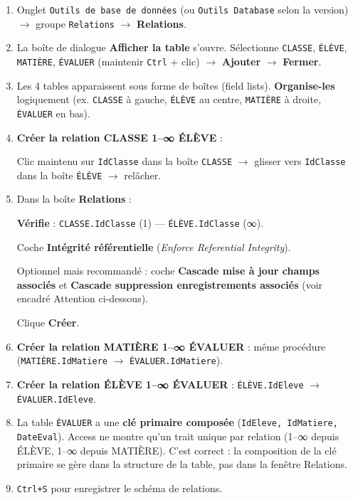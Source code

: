 \documentclass[11pt]{article}
\begin{document}
\begin{methode}
\begin{enumerate}
    \item Onglet \texttt{Outils de base de données} (ou \texttt{Outils Database} selon la version) $\to$ groupe \texttt{Relations} $\to$ \textbf{Relations}.
    \item La boîte de dialogue \textbf{Afficher la table} s'ouvre. Sélectionne \texttt{CLASSE}, \texttt{ÉLÈVE}, \texttt{MATIÈRE}, \texttt{ÉVALUER} (maintenir \texttt{Ctrl} + clic) $\to$ \textbf{Ajouter} $\to$ \textbf{Fermer}.
    \item Les 4 tables apparaissent sous forme de boîtes (field lists). \textbf{Organise-les} logiquement (ex. \texttt{CLASSE} à gauche, \texttt{ÉLÈVE} au centre, \texttt{MATIÈRE} à droite, \texttt{ÉVALUER} en bas).
    \item \textbf{Créer la relation CLASSE 1–∞ ÉLÈVE} :\par
    Clic maintenu sur \texttt{IdClasse} dans la boîte \texttt{CLASSE} $\to$ glisser vers \texttt{IdClasse} dans la boîte \texttt{ÉLÈVE} $\to$ relâcher.
    \item Dans la boîte \textbf{Relations} :\par
    \textbf{Vérifie} : \texttt{CLASSE.IdClasse} (1) — \texttt{ÉLÈVE.IdClasse} (∞).\par
    Coche \textbf{Intégrité référentielle} (\emph{Enforce Referential Integrity}).\par
    Optionnel mais recommandé : coche \textbf{Cascade mise à jour champs associés} et \textbf{Cascade suppression enregistrements associés} (voir encadré Attention ci-dessous).\par
    Clique \textbf{Créer}.
    \item \textbf{Créer la relation MATIÈRE 1–∞ ÉVALUER} : même procédure (\texttt{MATIÈRE.IdMatiere} $\to$ \texttt{ÉVALUER.IdMatiere}).
    \item \textbf{Créer la relation ÉLÈVE 1–∞ ÉVALUER} : \texttt{ÉLÈVE.IdEleve} $\to$ \texttt{ÉVALUER.IdEleve}.
    \item La table \texttt{ÉVALUER} a une \textbf{clé primaire composée} (\texttt{IdEleve, IdMatiere, DateEval}). Access ne montre qu'un trait unique par relation (1–∞ depuis ÉLÈVE, 1–∞ depuis MATIÈRE). C'est correct : la composition de la clé primaire se gère dans la structure de la table, pas dans la fenêtre Relations.
    \item \texttt{Ctrl+S} pour enregistrer le schéma de relations.
\end{enumerate}
\end{methode}
\end{document}

